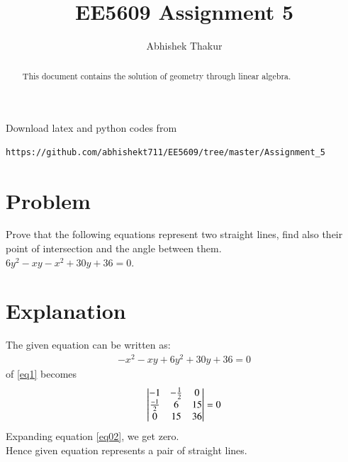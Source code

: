 \documentclass[journal,12pt,twocolumn]{IEEEtran}
\begin{document}
     \def\rightbox#1{\makebox[0in][r]{#1}}
     \def\centbox#1{\makebox[0in]{#1}}
     \def\topbox#1{\raisebox{-\baselineskip}[0in][0in]{#1}}
     \def\midbox#1{\raisebox{-0.5\baselineskip}[0in][0in]{#1}}
\vspace{3cm}
\title{EE5609 Assignment 5}
\author{Abhishek Thakur}
\maketitle
\newpage
\bigskip
\renewcommand{\thefigure}{\theenumi}
\renewcommand{\thetable}{\theenumi}
\begin{abstract}
This document contains the solution of geometry through linear algebra.
\end{abstract}
Download latex and python codes from 
\begin{lstlisting}
https://github.com/abhishekt711/EE5609/tree/master/Assignment_5
\end{lstlisting}
%
\section{Problem}
Prove that the following equations represent two straight lines, find also their point of intersection and the angle between them.\\
$6y^2-xy-x^2+30y+36=0$.
\section{Explanation}
The given equation can be written as:
\begin{align}
-x^2-xy+6y^2+30y+36=0 \label{eq1}
\end{align}
 of \eqref{eq1} becomes
\begin{align}
    \begin{vmatrix}-1&-\frac{1}{2}&0\\\frac{-1}{2}&6&15\\0&15&36\end{vmatrix}=0\label{eq02}
\end{align}
Expanding equation \eqref{eq02}, we get zero.\\
Hence given equation represents a pair of straight lines.
\end{document}
